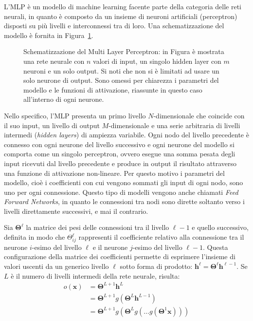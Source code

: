 L'MLP è un modello di machine learning facente parte della categoria delle reti
neurali, in quanto è composto da un insieme di neuroni artificiali (perceptron)
disposti su più livelli e interconnessi tra di loro. Una schematizzazione del
modello è fornita in Figura~\ref{fig:mlp}.
\begin{figure}[H]
  \caption{Schematizzazione del Multi Layer Perceptron: in Figura è mostrata
    una rete neurale con $n$ valori di input, un singolo hidden layer con $m$
    neuroni e un solo output. Si noti che non si è limitati ad usare un solo
    neurone di output. Sono omessi per chiarezza i parametri del modello e le
    funzioni di attivazione, riassunte in questo caso all'interno di ogni
    neurone.%
  }%
  \label{fig:mlp}
\end{figure}
Nello specifico, l'MLP presenta un primo livello $N$-dimensionale che coincide con il
suo input, un livello di output $M$-dimensionale e una serie arbitraria di
livelli intermedi (\emph{hidden layers}) di ampiezza variabile. Ogni nodo del
livello precedente è connesso con ogni neurone del livello successivo e ogni
neurone del modello si comporta come un singolo perceptron, ovvero esegue una
somma pesata degli input ricevuti dal livello precedente e produce in output il
risultato attraverso una funzione di attivazione non-lineare. Per questo motivo
i parametri del modello, cioè i coefficienti con cui vengono sommati gli input
di ogni nodo, sono uno per ogni connessione. Questo tipo di modelli vengono
anche chiamati \emph{Feed Forward Networks}, in quanto le connessioni tra nodi
sono dirette soltanto verso i livelli direttamente successivi, e mai il
contrario.

Sia $\bm \Theta^\ell$ la matrice dei pesi delle connessioni tra il livello
$\ell-1$ e quello successivo, definita in modo che $ \Theta^\ell_{ij} $
rappresenti il coefficiente relativo alla connessione tra il neurone $i$-esimo
del livello $\ell$ e il neurone $j$-esimo del livello $\ell-1$. Questa
configurazione della matrice dei coefficienti permette di esprimere l'insieme
di valori uscenti da un generico livello $\ell$ sotto forma di prodotto: $ \bm
h^\ell = \bm \Theta^\ell \bm h^{\ell-1}$. Se $L$ è il numero di livelli
intermedi della rete neurale, risulta:
\begin{align*}
  o(\bm x) &= \bm \Theta^{L+1} \bm h^L \\
  &= \bm \Theta^{L+1} g( \bm \Theta^L \bm h^{L-1}) \\
  &= \bm \Theta^{L+1} g(\bm \Theta^L g(\dots g(\bm \Theta^1 \bm x)))
\end{align*}
